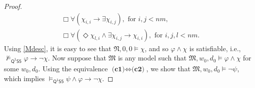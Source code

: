\documentclass[10pt,a4paper]{amsart}
\theoremstyle{plain}
\theoremstyle{definition}
\newcommand{\FOMS}{\ensuremath{\mathsf{Q^1S5}}}
\newcommand{\fform}[1]{\boldsymbol{#1}}
\newcommand{\gvar}{\fform{g}}
\newcommand{\Bv}{\forall}
\newcommand{\Bh}{\Box}
\newcommand{\Dv}{\exists}
\newcommand{\Dh}{\Diamond}
\begin{document}
\begin{proof}
\begin{align}
		&\Box \forall(\chi_{i,i} \rightarrow \Dv \chi_{i,j}), \text{ for $i,j<nm$},\\
		\label{sol}
		&\Bh\Bv(\Dh \chi_{l,i} \wedge \Dv \chi_{i,j} \rightarrow \chi_{i,i}), \text{ for $i,j,l <nm$}.
	\end{align}
	Using \eqref{Mdesc}, it is easy to see that
	$\mathfrak{N},0,0\models \chi$, and so $\varphi \wedge \chi$ is satisfiable, i.e., $\not\models_\FOMS\varphi\to \neg\chi$. 
	Now suppose that $\mathfrak{M}$ is any model such that $\mathfrak{M},w_0,d_0 \models \varphi\wedge\chi$ for some $w_0,d_0$. Using the 
	equivalence $\textbf{(c1)} \Leftrightarrow \textbf{(c2)}$, we show that $\mathfrak{M},w_0,d_0 \models\neg\psi$, which implies $\models_\FOMS \psi\land \varphi \to \neg\chi$. 
	

\end{proof}
\end{document}
